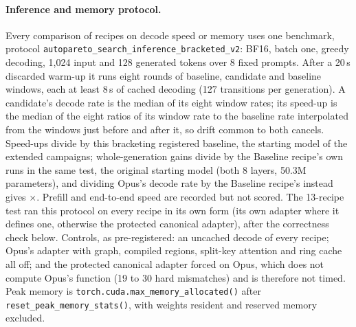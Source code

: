 \documentclass{article}
\begin{document}
\par\medskip
\begin{table}[H]
\caption{Recorded software environment by era. Panel, Pair-A (extended experiments), E1, Opus-test and 13-recipe rows are read from their run records. Other rows are from the provenance audit. $^\dagger$Driver 595.112.07 after the host restart of 2026-11-16 (Appendix~\ref{app:repro}).}\label{tab:env}
\centering\scriptsize
\end{table}

\paragraph{Inference and memory protocol.} Every comparison of recipes on decode speed or memory uses one benchmark, protocol \texttt{autopareto\_search\_inference\_bracketed\_v2}: BF16, batch one, greedy decoding, 1,024 input and 128 generated tokens over 8 fixed prompts. After a 20\,s discarded warm-up it runs eight rounds of baseline, candidate and baseline windows, each at least 8\,s of cached decoding (127 transitions per generation). A candidate's decode rate is the median of its eight window rates; its speed-up is the median of the eight ratios of its window rate to the baseline rate interpolated from the windows just before and after it, so drift common to both cancels. Speed-ups divide by this bracketing registered baseline, the starting model of the extended campaigns; whole-generation gains divide by the Baseline recipe's own runs in the same test, the original starting model (both 8 layers, 50.3M parameters), and dividing Opus's decode rate by the Baseline recipe's instead gives \CRSixDecXVsBaseRecipe$\times$. Prefill and end-to-end speed are recorded but not scored. The 13-recipe test ran this protocol on every recipe in its own form (its own adapter where it defines one, otherwise the protected canonical adapter), after the correctness check below. Controls, as pre-registered: an uncached decode of every recipe; Opus's adapter with graph, compiled regions, split-key attention and ring cache all off; and the protected canonical adapter forced on Opus, which does not compute Opus's function (19 to 30 hard mismatches) and is therefore not timed. Peak memory is \texttt{torch.cuda.max\_memory\_allocated()} after \texttt{reset\_peak\_memory\_stats()}, with weights resident and reserved memory excluded.
\end{document}
